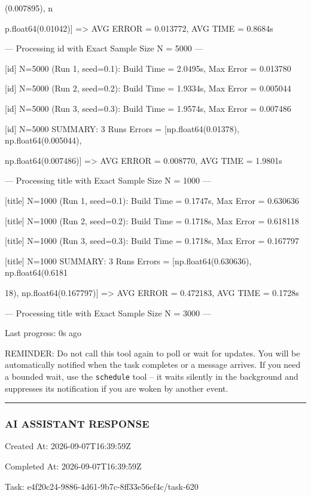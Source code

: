 \documentclass[11pt,a4paper]{article}
\begin{document}
(0.007895), n

p.float64(0.01042)] => AVG ERROR = 0.013772, AVG TIME = 0.8684s

--- Processing id with Exact Sample Size N = 5000 ---

[id] N=5000 (Run 1, seed=0.1): Build Time = 2.0495s, Max Error = 0.013780

[id] N=5000 (Run 2, seed=0.2): Build Time = 1.9334s, Max Error = 0.005044

[id] N=5000 (Run 3, seed=0.3): Build Time = 1.9574s, Max Error = 0.007486

[id] N=5000 SUMMARY: 3 Runs Errors = [np.float64(0.01378), np.float64(0.005044),

np.float64(0.007486)] => AVG ERROR = 0.008770, AVG TIME = 1.9801s


--- Processing title with Exact Sample Size N = 1000 ---

[title] N=1000 (Run 1, seed=0.1): Build Time = 0.1747s, Max Error = 0.630636

[title] N=1000 (Run 2, seed=0.2): Build Time = 0.1718s, Max Error = 0.618118

[title] N=1000 (Run 3, seed=0.3): Build Time = 0.1718s, Max Error = 0.167797

[title] N=1000 SUMMARY: 3 Runs Errors = [np.float64(0.630636), np.float64(0.6181

18), np.float64(0.167797)] => AVG ERROR = 0.472183, AVG TIME = 0.1728s

--- Processing title with Exact Sample Size N = 3000 ---


Last progress: 0s ago



REMINDER: Do not call this tool again to poll or wait for updates. You will be automatically notified when the task completes or a message arrives. If you need a bounded wait, use the \texttt{schedule} tool -- it waits silently in the background and suppresses its notification if you are woken by another event.


\hrule

\subsubsection{AI ASSISTANT RESPONSE}

Created At: 2026-09-07T16:39:59Z

Completed At: 2026-09-07T16:39:59Z

Task: e4f20c24-9886-4d61-9b7c-8ff33e56ef4c/task-620
\end{document}
